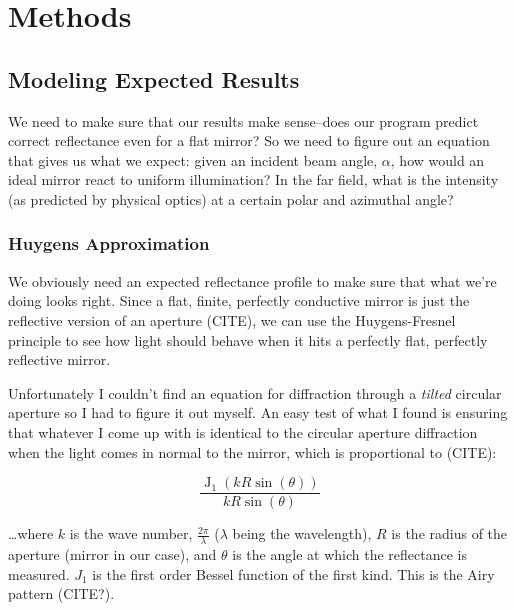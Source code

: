 \documentclass[etd,twoside,senior]{BYUPhys}
\DeclareMathOperator{\J}{J}
\begin{document}






\chapter{Methods} \label{chap:math}

\section{Modeling Expected Results} \label{sec:expected_results}

We need to make sure that our results make sense--does our program predict correct reflectance even for a flat mirror? So we need to figure out an equation that gives us what we expect: given an incident beam angle, $\alpha$, how would an ideal mirror react to uniform illumination? In the far field, what is the intensity (as predicted by physical optics) at a certain polar and azimuthal angle?

\subsection{Huygens Approximation} \label{subsec:huygens_approx}

We obviously need an expected reflectance profile to make sure that what we're doing looks right. Since a flat, finite, perfectly conductive mirror is just the reflective version of an aperture (CITE), we can use the Huygens-Fresnel principle to see how light should behave when it hits a perfectly flat, perfectly reflective mirror.

Unfortunately I couldn't find an equation for diffraction through a \textit{tilted} circular aperture so I had to figure it out myself. An easy test of what I found is ensuring that whatever I come up with is identical to the circular aperture diffraction when the light comes in normal to the mirror, which is proportional to (CITE):

\begin{equation}\label{eq:airy}
  \frac{\J_1(kR\sin(\theta))}{kR\sin(\theta)}
\end{equation}

\ldots where $k$ is the wave number, $\frac{2\pi}{\lambda}$ ($\lambda$ being the wavelength), $R$ is the radius of the aperture (mirror in our case), and $\theta$ is the angle at which the reflectance is measured. $J_1$ is the first order Bessel function of the first kind. This is the Airy pattern (CITE?).
\end{document}
